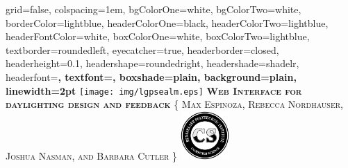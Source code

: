 \documentclass[landscape,final,a0paper,fontscale=0.285]{baposter}
\begin{document}
\begin{poster}%
  {
  grid=false,
  colspacing=1em,
  bgColorOne=white,
  bgColorTwo=white,
  borderColor=lightblue,
  headerColorOne=black,
  headerColorTwo=lightblue,
  headerFontColor=white,
  boxColorOne=white,
  boxColorTwo=lightblue,
  textborder=roundedleft,
  eyecatcher=true,
  headerborder=closed,
  headerheight=0.1\textheight,
  headershape=roundedright,
  headershade=shadelr,
  headerfont=\Large\bf\textsc, %
  textfont={\setlength{\parindent}{1.5em}},
  boxshade=plain,
  background=plain,
  linewidth=2pt
  }
  {\texttt{[image: img/lgpsealm.eps]}}
  {\bf\textsc{Web Interface for daylighting design and feedback }\vspace{0.5em}}
  {\textsc{\{ Max Espinoza, Rebecca Nordhauser, Joshua Nasman, and Barbara Cutler \}}}
  {%
    \includegraphics[height=5.0em]{img/logo_cs_design_1.png}
  }

    \newcommand{\colouredcircle}{%
      \tikz{\useasboundingbox (-0.2em,-0.32em) rectangle(0.2em,0.32em); \draw[draw=black,fill=lightblue,line width=0.03em] (0,0) circle(0.18em);}}

\end{poster}
\end{document}
